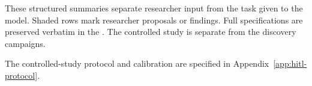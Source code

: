 These structured summaries separate researcher input from the task given
to the model. Shaded rows mark researcher proposals or findings. Full
specifications are preserved verbatim in the \artifactlink{}.
The controlled study is separate from the discovery campaigns.






The controlled-study protocol and calibration are specified in
Appendix~\ref{app:hitl-protocol}.

